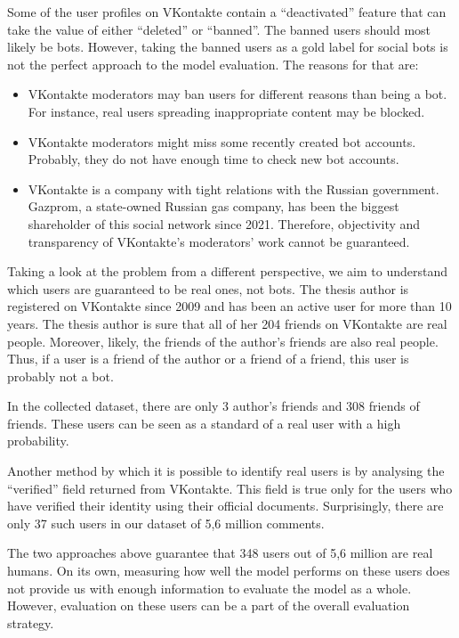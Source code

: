 Some of the user profiles on VKontakte contain a ``deactivated'' feature that can take the value of either ``deleted'' or ``banned''. The banned users should most likely be bots. However, taking the banned users as a gold label for social bots is not the perfect approach to the model evaluation. The reasons for that are:
\begin{itemize}
    \item VKontakte moderators may ban users for different reasons than being a bot. For instance, real users spreading inappropriate content may be blocked.
    \item VKontakte moderators might miss some recently created bot accounts. Probably, they do not have enough time to check new bot accounts.
    \item VKontakte is a company with tight relations with the Russian government. Gazprom, a state-owned Russian gas company, has been the biggest shareholder of this social network since 2021\cite{vkgazprom}. Therefore, objectivity and transparency of VKontakte's moderators' work cannot be guaranteed.
\end{itemize}

Taking a look at the problem from a different perspective, we aim to understand which users are guaranteed to be real ones, not bots. The thesis author is registered on VKontakte since 2009 and has been an active user for more than 10 years. The thesis author is sure that all of her 204 friends on VKontakte are real people. Moreover, likely, the friends of the author's friends are also real people. Thus, if a user is a friend of the author or a friend of a friend, this user is probably not a bot.

In the collected dataset, there are only 3 author's friends and 308 friends of friends. These users can be seen as a standard of a real user with a high probability.

Another method by which it is possible to identify real users is by analysing the ``verified'' field returned from VKontakte. This field is true only for the users who have verified their identity using their official documents. Surprisingly, there are only 37 such users in our dataset of 5,6 million comments.

The two approaches above guarantee that 348 users out of 5,6 million are real humans. On its own, measuring how well the model performs on these users does not provide us with enough information to evaluate the model as a whole. However, evaluation on these users can be a part of the overall evaluation strategy.


